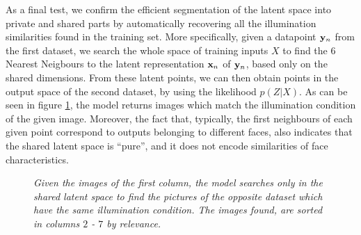 \par As a final test, we confirm the efficient segmentation of the latent space into private and shared parts by automatically recovering all the illumination similarities found in
the training set.
 More specifically, given a datapoint $\mathbf{y}_n$ from the first dataset, we search the whole space of training inputs $X$ to find the $6$ Nearest Neigbours to the latent representation 
$\mathbf{x}_n$ of $\mathbf{y}_n$, based only on the shared dimensions. 
 From these latent points, we can then obtain points in the output space of the second dataset, by using the likelihood $p(Z | X)$.
 As can be seen in figure \ref{fig:yale6SetsGrouping}, the model returns images which match
the illumination condition of the given image. Moreover, the fact that, typically, the first
neighbours of each given point correspond to outputs belonging to different faces, also indicates that
the shared latent space is ``pure'', and it does not encode similarities of face characteristics.
\begin{figure}[ht]
\begin{center}
 \vspace{-16pt}
 \newline
{}
 \vspace{-16pt}
 \newline
{}
 \vspace{-16pt}
 \newline
{}
 \vspace{-16pt}
 \newline
\end{center}
\vspace{-9pt}
\caption{\small{ \it
Given the images of the first column, the model searches only in the shared latent space to find the pictures of the opposite dataset
which have the same illumination condition. The images found, are sorted in columns
$2$ - $7$ by relevance.
}}
\label{fig:yale6SetsGrouping}
\vspace{-8pt}
\end{figure}

